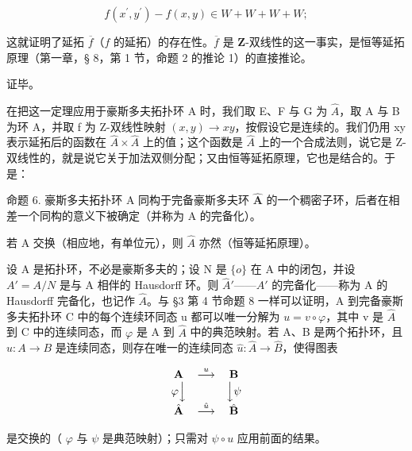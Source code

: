 \[
f \left(x ^ {\prime}, y ^ {\prime}\right) - f (x, y) \in W + W + W + W;
\]

这就证明了延拓 \(\overline{f}\)（\(f\) 的延拓）的存在性。\(\overline{f}\) 是 \(\mathbf{Z}\)-双线性的这一事实，是恒等延拓原理（第一章，§ 8，第 1 节，命题 2 的推论 1）的直接推论。

证毕。

在把这一定理应用于豪斯多夫拓扑环 A 时，我们取 E、F 与 G 为 \(\hat{A}\)，取 A 与 B 为环 A，并取 f 为 Z-双线性映射 \((x, y) \to xy\)，按假设它是连续的。我们仍用 xy 表示延拓后的函数在 \(\hat{A} \times \hat{A}\) 上的值；这个函数是 \(\hat{A}\) 上的一个合成法则，说它是 Z-双线性的，就是说它关于加法双侧分配；又由恒等延拓原理，它也是结合的。于是：

命题 6. 豪斯多夫拓扑环 A 同构于完备豪斯多夫环 \(\hat{\mathbf{A}}\) 的一个稠密子环，后者在相差一个同构的意义下被确定（并称为 A 的完备化）。

若 A 交换（相应地，有单位元），则 \(\hat{A}\) 亦然（恒等延拓原理）。

设 A 是拓扑环，不必是豪斯多夫的；设 N 是 \(\{o\}\) 在 A 中的闭包，并设 \(A' = A/N\) 是与 A 相伴的 Hausdorff 环。则 \(\hat{A}'\)——\(A'\) 的完备化——称为 A 的 Hausdorff 完备化，也记作 \(\hat{A}\)。与 §3 第 4 节命题 8 一样可以证明，A 到完备豪斯多夫拓扑环 C 中的每个连续环同态 u 都可以唯一分解为 \(u = v \circ \varphi\)，其中 v 是 \(\hat{A}\) 到 C 中的连续同态，而 \(\varphi\) 是 A 到 \(\hat{A}\) 中的典范映射。若 A、B 是两个拓扑环，且 \(u : A \to B\) 是连续同态，则存在唯一的连续同态 \(\hat{u} : \hat{A} \to \hat{B}\)，使得图表

\[
\begin{array}{c c c} \mathbf {A} & \stackrel {{u}} {{\longrightarrow}} & \mathbf {B} \\ \varphi \Big \downarrow & & \Big \downarrow \psi \\ \hat {\mathbf {A}} & \stackrel {{\hat {u}}} {{\longrightarrow}} & \hat {\mathbf {B}} \end{array}
\]

是交换的（ \(\varphi\) 与 \(\psi\) 是典范映射）；只需对 \(\psi \circ u\) 应用前面的结果。

